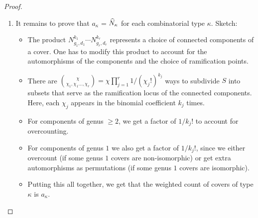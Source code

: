 \begin{proof}
\begin{enumerate}
 \item It remains to prove that $a_\kappa$ = $\widehat{N}_\kappa$ for each combinatorial type $\kappa$. Sketch:
 \begin{itemize}
  \item The product $N_{g_1,d_1}^{k_1}\dotsm N_{g_r,d_r}^{k_r}$ represents a choice of connected components of a cover. One has to modify this product to account for the automorphisms of the components and the choice of ramification points.
  \item There are $\binom{\chi}{\chi_1,\chi_1\dotsc,\chi_r}=\chi\prod_{j=1}^r 1/(\chi_j!)^{k_j}$ ways to subdivide $S$ into subsets that serve as the ramification locus of the connected components. Here, each $\chi_j$ appears in the binomial coefficient $k_j$ times.
  \item For components of genus $\geq 2$, we get a factor of $1/k_j!$ to account for overcounting.
  \item For components of genus $1$ we also get a factor of $1/k_j!$, since we either overcount (if some genus $1$ covers are non-isomorphic) or get extra automorphisms as permutations (if some genus $1$ covers are isomorphic).
  \item Putting this all together, we get that the weighted count of covers of type $\kappa$ is $a_\kappa$.
 \end{itemize}

\end{enumerate}

\end{proof}